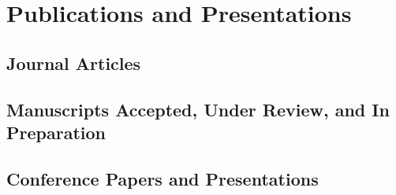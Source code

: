 \section{Publications and Presentations}

\newrefsection\nocite{*}
\subsection{Journal Articles}
\printbibliography[heading=none,type=article]

\newrefsection\nocite{*}
\subsection{Manuscripts Accepted, Under Review, and In Preparation}
\printbibliography[heading=none,type=unpublished]

\newrefsection\nocite{*}
\subsection{Conference Papers and Presentations}
\printbibliography[heading=none, type=inproceedings]


